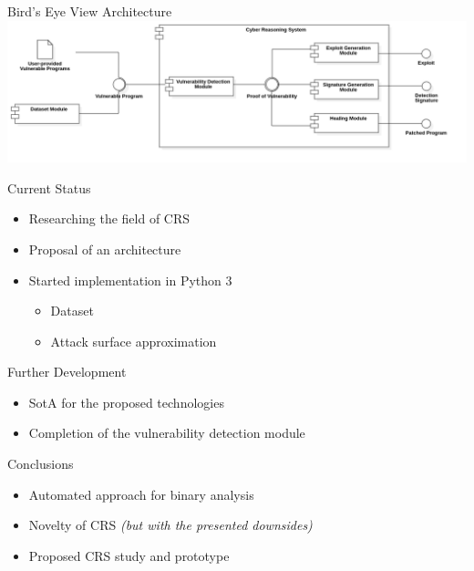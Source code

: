 \documentclass{beamer}
\begin{document}
\begin{frame}{Bird's Eye View Architecture} \pause
	\includegraphics[width=\textwidth, center]{images/architecture.png}
    \captionsetup{justification=centering,margin=1cm}
\end{frame}

\begin{frame}{Current Status} \pause
	\begin{itemize}
		\item Researching the field of CRS \pause
	    \item Proposal of an architecture \pause
	    \item Started implementation in Python 3 \pause
		    \begin{itemize}
		        \item Dataset \pause
		        \item Attack surface approximation
	        \end{itemize}
	\end{itemize}
\end{frame}

\begin{frame}{Further Development} \pause
	\begin{itemize}
		\item SotA for the proposed technologies \pause
	    \item Completion of the vulnerability detection module
	\end{itemize}
\end{frame}

\begin{frame}{Conclusions} \pause
	\begin{itemize}
		\item Automated approach for binary analysis \pause
	    \item Novelty of CRS \pause \textit{(but with the presented downsides)} \pause
	    \item Proposed CRS study and prototype
	\end{itemize}
\end{frame}
\end{document}
